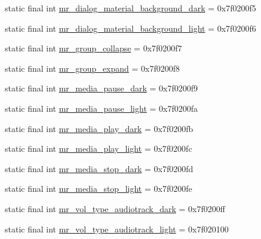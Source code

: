 \begin{CompactItemize}
static final int \hyperlink{classandroid_1_1support_1_1v7_1_1appcompat_1_1_r_1_1drawable_9d8d61e8563dc99d67553aa8d02cc3dc}{mr\_\-dialog\_\-material\_\-background\_\-dark} = 0x7f0200f5
\item 
static final int \hyperlink{classandroid_1_1support_1_1v7_1_1appcompat_1_1_r_1_1drawable_72f223417a8cfc0b9f384e03344921eb}{mr\_\-dialog\_\-material\_\-background\_\-light} = 0x7f0200f6
\item 
static final int \hyperlink{classandroid_1_1support_1_1v7_1_1appcompat_1_1_r_1_1drawable_50da631cc53d9331af970b7bb0202769}{mr\_\-group\_\-collapse} = 0x7f0200f7
\item 
static final int \hyperlink{classandroid_1_1support_1_1v7_1_1appcompat_1_1_r_1_1drawable_3654faf00e7583ed569204e489f4d2b7}{mr\_\-group\_\-expand} = 0x7f0200f8
\item 
static final int \hyperlink{classandroid_1_1support_1_1v7_1_1appcompat_1_1_r_1_1drawable_4631576c7f78ba37cb1329621efdc8e4}{mr\_\-media\_\-pause\_\-dark} = 0x7f0200f9
\item 
static final int \hyperlink{classandroid_1_1support_1_1v7_1_1appcompat_1_1_r_1_1drawable_26bd5d9238fbe8ec4c4805ee50a79083}{mr\_\-media\_\-pause\_\-light} = 0x7f0200fa
\item 
static final int \hyperlink{classandroid_1_1support_1_1v7_1_1appcompat_1_1_r_1_1drawable_4bd44810f27de0e3901bc5f80f6dcd1c}{mr\_\-media\_\-play\_\-dark} = 0x7f0200fb
\item 
static final int \hyperlink{classandroid_1_1support_1_1v7_1_1appcompat_1_1_r_1_1drawable_f4bb16646ea8ea98a51afb34d7d8332c}{mr\_\-media\_\-play\_\-light} = 0x7f0200fc
\item 
static final int \hyperlink{classandroid_1_1support_1_1v7_1_1appcompat_1_1_r_1_1drawable_db0763561f71ebefe220019cd6562ccf}{mr\_\-media\_\-stop\_\-dark} = 0x7f0200fd
\item 
static final int \hyperlink{classandroid_1_1support_1_1v7_1_1appcompat_1_1_r_1_1drawable_d476ed86698cc83ac3e2b37292960a82}{mr\_\-media\_\-stop\_\-light} = 0x7f0200fe
\item 
static final int \hyperlink{classandroid_1_1support_1_1v7_1_1appcompat_1_1_r_1_1drawable_b90e39233462045dfc935e523f93cb63}{mr\_\-vol\_\-type\_\-audiotrack\_\-dark} = 0x7f0200ff
\item 
static final int \hyperlink{classandroid_1_1support_1_1v7_1_1appcompat_1_1_r_1_1drawable_82ceb5d7af19da05dbf9e96c0d35b6ac}{mr\_\-vol\_\-type\_\-audiotrack\_\-light} = 0x7f020100
\item 

\end{CompactItemize}
